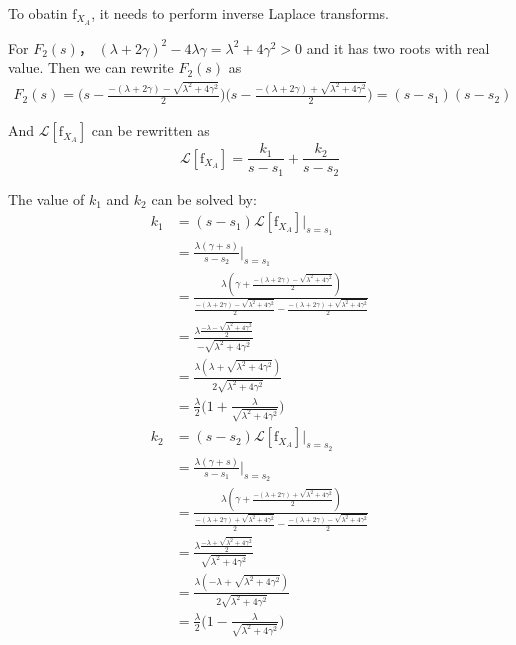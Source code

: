 \documentclass[UTF8]{article}
\begin{document}
\begin{enumerate}[a)]
        To obatin $\text{f}_{X_A}$, it needs to perform inverse Laplace transforms.

        For $F_2(s)$， $(\lambda+2\gamma)^2-4\lambda\gamma=\lambda^2+4\gamma^2>0$ and it has two roots with real value. Then we can rewrite $F_2(s)$ as 
        \begin{equation*}
            \begin{aligned}
                F_2(s)=\bigg(s-\frac{-(\lambda+2\gamma)-\sqrt{\lambda^2+4\gamma^2}}{2}\bigg)\bigg(s-\frac{-(\lambda+2\gamma)+\sqrt{\lambda^2+4\gamma^2}}{2}\bigg)=(s-s_1)(s-s_2)
            \end{aligned}
        \end{equation*}

        And $\mathcal{L}[\text{f}_{X_A}]$ can be rewritten as
        \begin{equation*}
            \mathcal{L}[\text{f}_{X_A}]=\frac{k_1}{s-s_1}+\frac{k_2}{s-s_2}
        \end{equation*}
        
        The value of $k_1$ and $k_2$ can be solved by:
        \begin{equation*}
            \begin{aligned}
                k_1&=(s-s_1)\mathcal{L}[\text{f}_{X_A}]\big|_{s=s_1}\\
                &=\frac{\lambda(\gamma+s)}{s-s_2}\bigg|_{s=s_1}\\
                &=\frac{\lambda(\gamma+\frac{-(\lambda+2\gamma)-\sqrt{\lambda^2+4\gamma^2}}{2})}{\frac{-(\lambda+2\gamma)-\sqrt{\lambda^2+4\gamma^2}}{2}-\frac{-(\lambda+2\gamma)+\sqrt{\lambda^2+4\gamma^2}}{2}}\\
                &=\frac{\lambda\frac{-\lambda-\sqrt{\lambda^2+4\gamma^2}}{2}}{-\sqrt{\lambda^2+4\gamma^2}}\\
                &=\frac{\lambda(\lambda+\sqrt{\lambda^2+4\gamma^2})}{2\sqrt{\lambda^2+4\gamma^2}}\\
                &=\frac{\lambda}{2}\bigg(1+\frac{\lambda}{\sqrt{\lambda^2+4\gamma^2}}\bigg)\\
                k_2 &=(s-s_2)\mathcal{L}[\text{f}_{X_A}]\big|_{s=s_2}\\
                &=\frac{\lambda(\gamma+s)}{s-s_1}\bigg|_{s=s_2}\\
                &=\frac{\lambda(\gamma+\frac{-(\lambda+2\gamma)+\sqrt{\lambda^2+4\gamma^2}}{2})}{\frac{-(\lambda+2\gamma)+\sqrt{\lambda^2+4\gamma^2}}{2}-\frac{-(\lambda+2\gamma)-\sqrt{\lambda^2+4\gamma^2}}{2}}\\
                &=\frac{\lambda\frac{-\lambda+\sqrt{\lambda^2+4\gamma^2}}{2}}{\sqrt{\lambda^2+4\gamma^2}}\\
                &=\frac{\lambda(-\lambda+\sqrt{\lambda^2+4\gamma^2})}{2\sqrt{\lambda^2+4\gamma^2}}\\
                &=\frac{\lambda}{2}\bigg(1-\frac{\lambda}{\sqrt{\lambda^2+4\gamma^2}}\bigg)
            \end{aligned}
        \end{equation*}


\end{enumerate}
\end{document}
